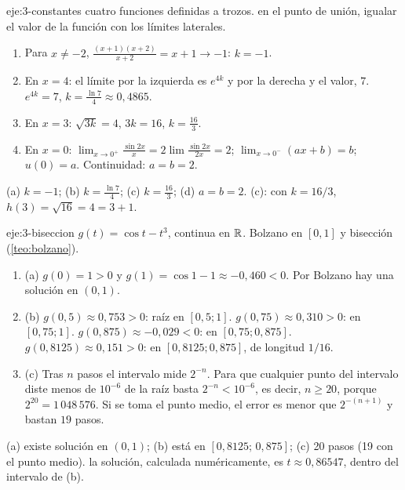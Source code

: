 \begin{solucion}{eje:3-constantes}
\datos cuatro funciones definidas a trozos.
\planteamiento en el punto de unión, igualar el valor de la función con los límites laterales.
\pasos
\begin{enumerate}[label=(\alph*)]
  \item Para $x\ne-2$, $\frac{(x+1)(x+2)}{x+2}=x+1\to-1$: $k=-1$.
  \item En $x=4$: el límite por la izquierda es $e^{4k}$ y por la derecha y el valor, $7$. $e^{4k}=7$, $k=\frac{\ln7}{4}\approx0{,}4865$.
  \item En $x=3$: $\sqrt{3k}=4$, $3k=16$, $k=\frac{16}{3}$.
  \item En $x=0$: $\lim_{x\to0^{+}}\frac{\sin2x}{x}=2\lim\frac{\sin2x}{2x}=2$; $\lim_{x\to0^{-}}(ax+b)=b$; $u(0)=a$. Continuidad: $a=b=2$.
\end{enumerate}
\resultado (a) $k=-1$; (b) $k=\frac{\ln7}{4}$; (c) $k=\frac{16}{3}$; (d) $a=b=2$.
\comprobacion (c): con $k=16/3$, $h(3)=\sqrt{16}=4=3+1$.
\end{solucion}

\begin{solucion}{eje:3-biseccion}
\datos $g(t)=\cos t-t^{3}$, continua en $\mathbb{R}$.
\planteamiento Bolzano en $[0,1]$ y bisección (\cref{teo:bolzano}).
\pasos
\begin{enumerate}[label=\arabic*.]
  \item (a) $g(0)=1>0$ y $g(1)=\cos1-1\approx-0{,}460<0$. Por Bolzano hay una solución en $(0,1)$.
  \item (b) $g(0{,}5)\approx0{,}753>0$: raíz en $[0{,}5;1]$. $g(0{,}75)\approx0{,}310>0$: en $[0{,}75;1]$. $g(0{,}875)\approx-0{,}029<0$: en $[0{,}75;0{,}875]$. $g(0{,}8125)\approx0{,}151>0$: en $[0{,}8125;0{,}875]$, de longitud $1/16$.
  \item (c) Tras $n$ pasos el intervalo mide $2^{-n}$. Para que cualquier punto del intervalo diste menos de $10^{-6}$ de la raíz basta $2^{-n}<10^{-6}$, es decir, $n\ge20$, porque $2^{20}=1\,048\,576$. Si se toma el punto medio, el error es menor que $2^{-(n+1)}$ y bastan $19$ pasos.
\end{enumerate}
\resultado (a) existe solución en $(0,1)$; (b) está en $[0{,}8125;\,0{,}875]$; (c) 20 pasos (19 con el punto medio).
\comprobacion la solución, calculada numéricamente, es $t\approx0{,}86547$, dentro del intervalo de (b).
\end{solucion}

